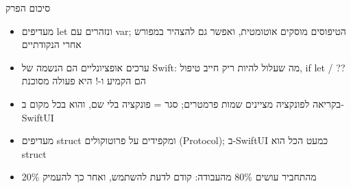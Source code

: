 \begin{tcbsummary}{סיכום הפרק}
\begin{itemize}
  \item מעדיפים let ונזהרים עם var; הטיפוסים מוסקים אוטומטית, ואפשר גם להצהיר במפורש אחרי הנקודתיים
  \item ערכים אופציונליים הם הנשמה של Swift: מה שעלול להיות ריק חייב טיפול, if let / ?? הם הקמיע ו-! היא פעולה מסוכנת
  \item בקריאה לפונקציה מציינים שמות פרמטרים; סגר = פונקציה בלי שם, והוא בכל מקום ב-SwiftUI
  \item מעדיפים struct ומקפידים על פרוטוקולים (Protocol); ב-SwiftUI כמעט הכל הוא struct
  \item 20\% מהתחביר עושים 80\% מהעבודה: קודם לדעת להשתמש, ואחר כך להעמיק
\end{itemize}

\end{tcbsummary}

